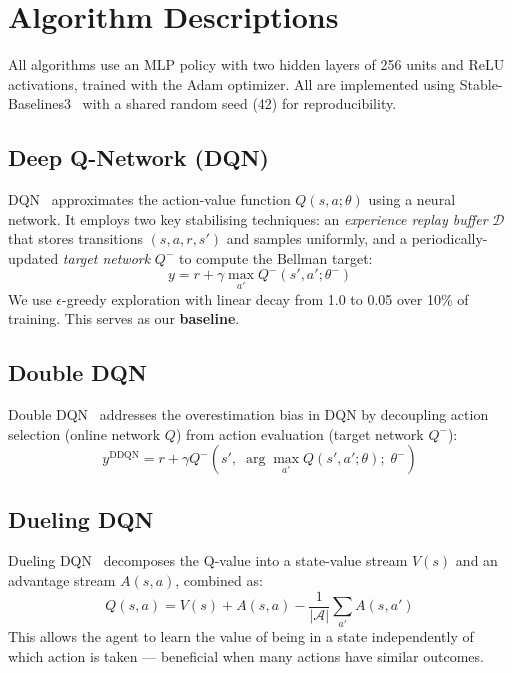 \documentclass[conference]{IEEEtran}
\begin{document}
\section{Algorithm Descriptions}

All algorithms use an MLP policy with two hidden layers of 256 units and ReLU activations,
trained with the Adam optimizer. All are implemented using
Stable-Baselines3~\cite{stable-baselines3} with a shared random seed (42) for
reproducibility.

\subsection{Deep Q-Network (DQN)}

DQN~\cite{mnih2015human} approximates the action-value function $Q(s,a;\theta)$ using a
neural network. It employs two key stabilising techniques: an \emph{experience replay
buffer} $\mathcal{D}$ that stores transitions $(s, a, r, s')$ and samples uniformly,
and a periodically-updated \emph{target network} $Q^{-}$ to compute the Bellman target:
\[
  y = r + \gamma \max_{a'} Q^{-}(s', a';\theta^{-})
\]
We use $\epsilon$-greedy exploration with linear decay from 1.0 to 0.05 over 10\% of
training. This serves as our \textbf{baseline}.

\subsection{Double DQN}

Double DQN~\cite{van2016deep} addresses the overestimation bias in DQN by decoupling
action selection (online network $Q$) from action evaluation (target network $Q^{-}$):
\[
  y^{\text{DDQN}} = r + \gamma Q^{-}\!\left(s',\; \arg\max_{a'} Q(s',a';\theta);\; \theta^{-}\right)
\]

\subsection{Dueling DQN}

Dueling DQN~\cite{wang2016dueling} decomposes the Q-value into a state-value stream
$V(s)$ and an advantage stream $A(s,a)$, combined as:
\[
  Q(s,a) = V(s) + A(s,a) - \frac{1}{|\mathcal{A}|}\sum_{a'}A(s,a')
\]
This allows the agent to learn the value of being in a state independently of which
action is taken — beneficial when many actions have similar outcomes.
\end{document}
